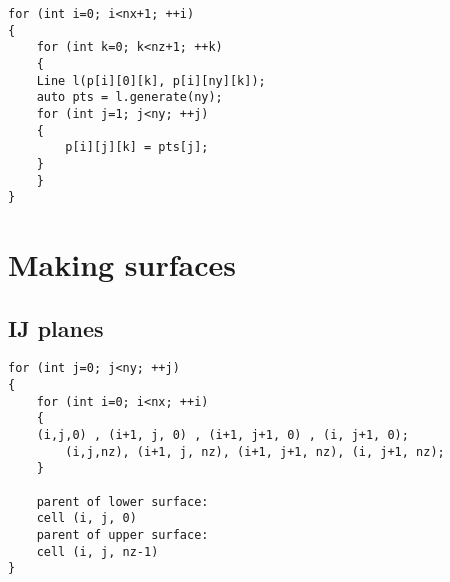 \documentclass{article}
\begin{document}
\begin{lstlisting}
for (int i=0; i<nx+1; ++i)
{
    for (int k=0; k<nz+1; ++k)
    {
	Line l(p[i][0][k], p[i][ny][k]);
	auto pts = l.generate(ny);
	for (int j=1; j<ny; ++j)
	{
	    p[i][j][k] = pts[j];
	}
    }
}
\end{lstlisting}



\section{Making surfaces}

\subsection{IJ planes}

\begin{lstlisting}
for (int j=0; j<ny; ++j)
{
    for (int i=0; i<nx; ++i)
    {
	(i,j,0) , (i+1, j, 0) , (i+1, j+1, 0) , (i, j+1, 0);
        (i,j,nz), (i+1, j, nz), (i+1, j+1, nz), (i, j+1, nz);
    }

    parent of lower surface: 
	cell (i, j, 0)
    parent of upper surface: 
	cell (i, j, nz-1)
}
\end{lstlisting}
\end{document}
